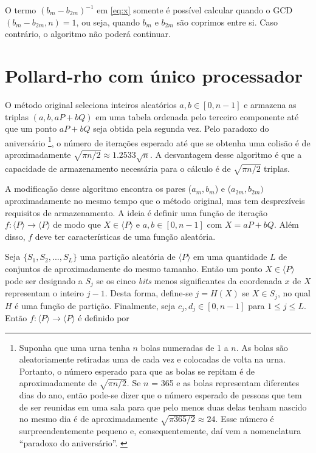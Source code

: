 O termo $(b_m - b_{2m})^{-1}$ em \ref{eq:x} somente é possível calcular quando o GCD$(b_m - b_{2m}, n) = 1$, ou seja, quando \(b_m\) e \(b_{2m}\) são coprimos entre si. Caso contrário, o algoritmo não poderá continuar.

%
%
\section{Pollard-rho com único processador}
O método original seleciona inteiros aleatórios $a, b \in [0, n-1]$ e armazena as triplas $(a, b, aP + bQ)$ em uma tabela ordenada pelo terceiro componente até que um ponto $aP + bQ$ seja obtida pela segunda vez. Pelo paradoxo do aniversário
\footnote{Suponha que uma urna tenha \(n\) bolas numeradas de 1 a \(n\). As bolas são aleatoriamente retiradas uma de cada vez e colocadas de volta na urna. Portanto, o número esperado para que as bolas se repitam é de aproximadamente de $\sqrt{\pi n/2}$. Se \(n\) = 365 e as bolas representam diferentes dias do ano, então pode-se dizer que o número esperado de pessoas que tem de ser reunidas em uma sala para que pelo menos duas delas tenham nascido no mesmo dia é de aproximadamente $\sqrt{\pi 365/2} \approx 24$. Esse número é surpreendentemente pequeno e, consequentemente, daí vem a nomenclatura ``paradoxo do aniversário''. \cite{Guide}},
o número de iterações esperado até que se obtenha uma colisão é de aproximadamente $\sqrt{\pi n/2} \approx 1.2533 \sqrt{n}$. A desvantagem desse algoritmo é que a capacidade de armazenamento necessária para o cálculo é de $\sqrt{\pi n/2}$ triplas.

A modificação desse algoritmo encontra os pares ($a_m, b_m$) e ($a_{2m}, b_{2m})$ aproximadamente no mesmo tempo que o método original, mas tem desprezíveis requisitos de armazenamento. A ideia é definir uma função de iteração $f : \langle P \rangle \to \langle P \rangle$ de modo que $X \in \langle P \rangle$ e $a, b \in [0, n-1]$ com $X = aP + bQ$. Além disso, \(f\) deve ter características de uma função aleatória.

Seja $\{S_1, S_2, ..., S_L\}$ uma partição aleatória de $\langle P \rangle$ em uma quantidade \(L\) de conjuntos de aproximadamente do mesmo tamanho. Então um ponto $X \in \langle P \rangle$ pode ser designado a \(S_j\) se os cinco \textit{bits} menos significantes da coordenada \(x\) de \(X\) representam o inteiro \(j-1\). Desta forma, define-se $j = H(X)$ se $X \in S_j$, no qual \(H\) é uma função de partição. Finalmente, seja $c_j, d_j \in [0, n-1]$ para $1 \leq j \leq L$. Então $f : \langle P \rangle \to  \langle P \rangle$ é definido por

